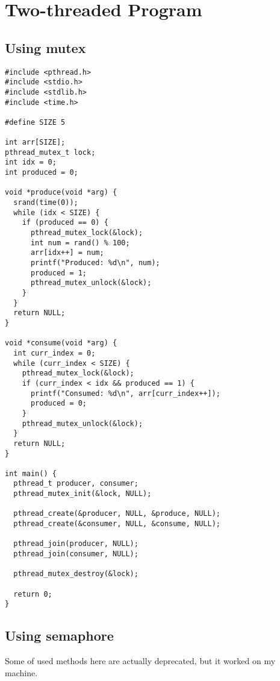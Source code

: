 \documentclass{article}
\begin{document}
\section{Two-threaded Program}
\subsection{Using mutex}%
\label{subsec:label}

\begin{lstlisting}[style=cstyle]
#include <pthread.h>
#include <stdio.h>
#include <stdlib.h>
#include <time.h>

#define SIZE 5

int arr[SIZE];
pthread_mutex_t lock;
int idx = 0;
int produced = 0;

void *produce(void *arg) {
  srand(time(0));
  while (idx < SIZE) {
    if (produced == 0) {
      pthread_mutex_lock(&lock);
      int num = rand() % 100;
      arr[idx++] = num;
      printf("Produced: %d\n", num);
      produced = 1;
      pthread_mutex_unlock(&lock);
    }
  }
  return NULL;
}

void *consume(void *arg) {
  int curr_index = 0;
  while (curr_index < SIZE) {
    pthread_mutex_lock(&lock);
    if (curr_index < idx && produced == 1) {
      printf("Consumed: %d\n", arr[curr_index++]);
      produced = 0;
    }
    pthread_mutex_unlock(&lock);
  }
  return NULL;
}

int main() {
  pthread_t producer, consumer;
  pthread_mutex_init(&lock, NULL);

  pthread_create(&producer, NULL, &produce, NULL);
  pthread_create(&consumer, NULL, &consume, NULL);

  pthread_join(producer, NULL);
  pthread_join(consumer, NULL);

  pthread_mutex_destroy(&lock);

  return 0;
}
\end{lstlisting}

\subsection{Using semaphore}%
Some of used methods here are actually deprecated, but it worked on my machine.
\end{document}
